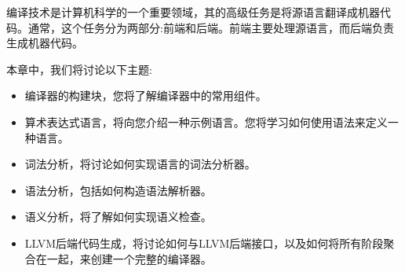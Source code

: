编译技术是计算机科学的一个重要领域，其的高级任务是将源语言翻译成机器代码。通常，这个任务分为两部分:前端和后端。前端主要处理源语言，而后端负责生成机器代码。\par

本章中，我们将讨论以下主题:\par

\begin{itemize}
	\item 编译器的构建块，您将了解编译器中的常用组件。
	\item 算术表达式语言，将向您介绍一种示例语言。您将学习如何使用语法来定义一种语言。
	\item 词法分析，将讨论如何实现语言的词法分析器。
	\item 语法分析，包括如何构造语法解析器。
	\item 语义分析，将了解如何实现语义检查。
	\item LLVM后端代码生成，将讨论如何与LLVM后端接口，以及如何将所有阶段聚合在一起，来创建一个完整的编译器。
\end{itemize}

\newpage
